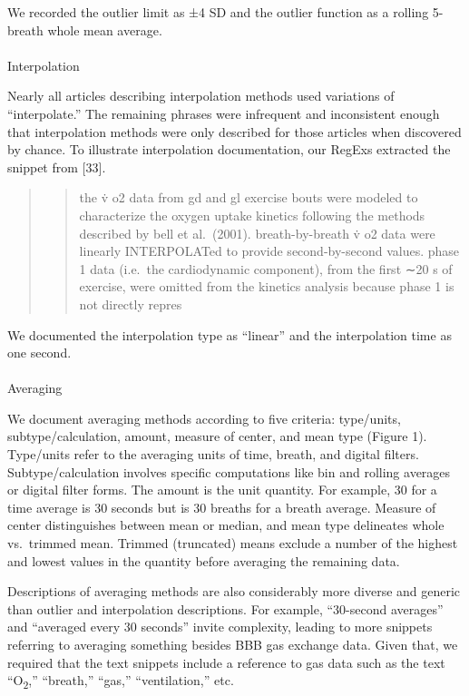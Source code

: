 \documentclass[
  letterpaper,
  DIV=11,
  numbers=noendperiod]{scrartcl}
\makeatletter
\let\oldparagraph\paragraph
\renewcommand{\paragraph}{
    \@ifstar
      \xxxParagraphStar
      \xxxParagraphNoStar
  }
\newcommand{\xxxParagraphStar}[1]{\oldparagraph*{#1}\mbox{}}
\newcommand{\xxxParagraphNoStar}[1]{\oldparagraph{#1}\mbox{}}
\makeatother
\begin{document}
We recorded the outlier limit as ±4 SD and the outlier function as a
rolling 5-breath whole mean average.

\paragraph{Interpolation}\label{interpolation}

Nearly all articles describing interpolation methods used variations of
``interpolate.'' The remaining phrases were infrequent and inconsistent
enough that interpolation methods were only described for those articles
when discovered by chance. To illustrate interpolation documentation,
our RegExs extracted the snippet from {[}33{]}.

\begin{quote}
\begin{quote}
the v̇ o2 data from gd and gl exercise bouts were modeled to characterize
the oxygen uptake kinetics following the methods described by bell et
al.~(2001). breath-by-breath v̇ o2 data were linearly INTERPOLATed to
provide second-by-second values. phase 1 data (i.e.~the cardiodynamic
component), from the first ∼20 s of exercise, were omitted from the
kinetics analysis because phase 1 is not directly repres
\end{quote}
\end{quote}

We documented the interpolation type as ``linear'' and the interpolation
time as one second.

\paragraph{Averaging}\label{averaging}

We document averaging methods according to five criteria: type/units,
subtype/calculation, amount, measure of center, and mean type (Figure
1). Type/units refer to the averaging units of time, breath, and digital
filters. Subtype/calculation involves specific computations like bin and
rolling averages or digital filter forms. The amount is the unit
quantity. For example, 30 for a time average is 30 seconds but is 30
breaths for a breath average. Measure of center distinguishes between
mean or median, and mean type delineates whole vs.~trimmed mean. Trimmed
(truncated) means exclude a number of the highest and lowest values in
the quantity before averaging the remaining data.

Descriptions of averaging methods are also considerably more diverse and
generic than outlier and interpolation descriptions. For example,
``30-second averages'' and ``averaged every 30 seconds'' invite
complexity, leading to more snippets referring to averaging something
besides BBB gas exchange data. Given that, we required that the text
snippets include a reference to gas data such as the text
``O\textsubscript{2},'' ``breath,'' ``gas,'' ``ventilation,'' etc.
\end{document}
